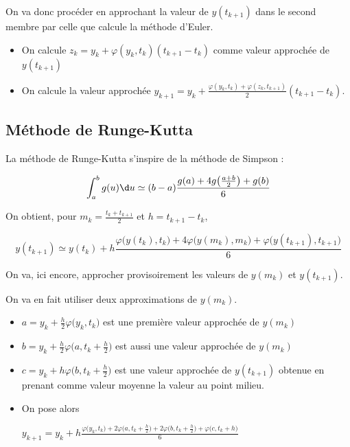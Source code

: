 On va donc procéder en approchant la valeur de $y(t_{k+1})$ dans le second membre par celle que calcule la méthode d'Euler.
\begin{itemize}
\item On calcule $z_k=y_k+\varphi(y_k,t_k)(t_{k+1}-t_k)$ comme valeur approchée de $y(t_{k+1})$
\item On calcule la valeur approchée $\displaystyle y_{k+1} = y_k +
\frac{\varphi(y_k,t_k)+\varphi(z_k,t_{k+1})} 2 (t_{k+1}-t_k)$.
\end{itemize}
\subsection{Méthode de Runge-Kutta}
La méthode de Runge-Kutta s'inspire de la méthode de Simpson : 

\[ \int_{a}^b g(u) \d u\simeq (b-a)\frac{g(a)+4g\bigl(\frac{a+b}2\bigr)+g(b)}6\]

On obtient, pour $m_k = \frac{t_k+t_{k+1}}2$ et $h=t_{k+1}-t_k$,

\[ y(t_{k+1})\simeq y(t_k) + h \frac {\varphi\bigl(y(t_k),t_k\bigr)+4\varphi\bigl(y(m_k),m_k\bigr) + \varphi\bigl(y(t_{k+1}),t_{k+1}\bigr)}6 \]


On va, ici encore, approcher provisoirement les valeurs de $y(m_k)$ et $y(t_{k+1})$.

On va en fait utiliser deux approximations de $y(m_k)$.


\begin{itemize}
\item $a = y_k+\frac{h}2 \varphi\bigl(y_k,t_k\bigr)$ est une première valeur approchée de $y(m_k)$

\item $ b = y_k + \frac{h}2 \varphi\bigl(a, t_k+\frac h2\bigr)$ est aussi une valeur approchée de $y(m_k)$

\item $c = y_k + h \varphi\bigl(b, t_k+\frac h2\bigr)$ est une valeur approchée de $y(t_{k+1})$ obtenue en prenant comme valeur moyenne la valeur au point milieu.
\item On pose alors 

$\displaystyle  y_{k+1} = y_k+ h \frac{\varphi\bigl(y_k,t_k\bigr) + 2\varphi\bigl(a, t_k+\frac h2\bigr) + 2\varphi\bigl(b, t_k+\frac h2\bigr)  + \varphi\bigl(c, t_k+h\bigr)}6$
\end{itemize}
\newpage
